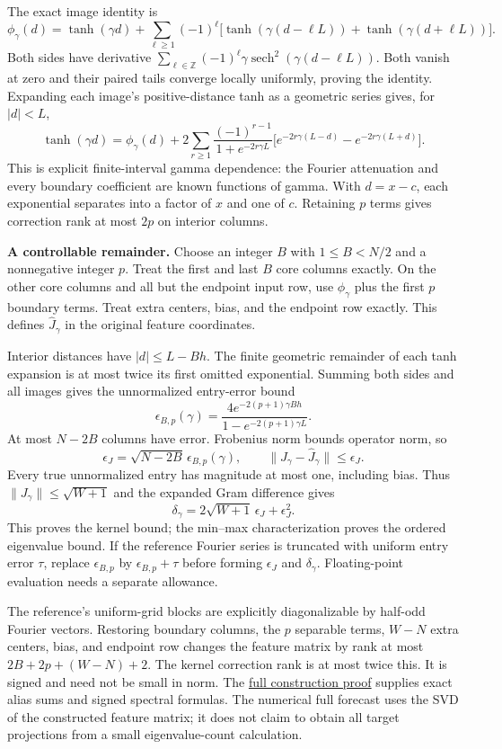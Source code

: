 \documentclass[11pt]{article}
\DeclareMathOperator{\sech}{sech}
\theoremstyle{definition}
\newcommand{\repo}{https://github.com/samlayton99/precision-mlps/blob/experiment/frozen-gamma-probe}
\begin{document}
The exact image identity is
\[
\phi_\gamma(d)=\tanh(\gamma d)+\sum_{\ell\ge1}(-1)^\ell
\big[\tanh(\gamma(d-\ell L))+\tanh(\gamma(d+\ell L))\big].
\]
Both sides have derivative
$\sum_{\ell\in\mathbb Z}(-1)^\ell\gamma\sech^2(\gamma(d-\ell L))$.
Both vanish at zero and their paired tails converge locally uniformly,
proving the identity. Expanding each image's positive-distance tanh as
a geometric series gives, for $|d|<L$,
\[
\tanh(\gamma d)=\phi_\gamma(d)+
2\sum_{r\ge1}\frac{(-1)^{r-1}}{1+e^{-2r\gamma L}}
\big[e^{-2r\gamma(L-d)}-e^{-2r\gamma(L+d)}\big].
\]
This is explicit finite-interval gamma dependence: the Fourier attenuation
and every boundary coefficient are known functions of gamma. With $d=x-c$,
each exponential separates into a factor of $x$ and one of $c$.
Retaining $p$ terms gives correction rank at most $2p$ on interior columns.

\textbf{A controllable remainder.}
Choose an integer $B$ with $1\le B<N/2$ and a nonnegative integer $p$.
Treat the first and last $B$ core columns exactly.
On the other core columns and all but the endpoint input row, use
$\phi_\gamma$ plus the first $p$ boundary terms. Treat extra centers, bias,
and the endpoint row exactly. This defines $\widehat J_\gamma$ in the
original feature coordinates.

Interior distances have $|d|\le L-Bh$. The finite geometric remainder of
each tanh expansion is at most twice its first omitted exponential.
Summing both sides and all images gives the unnormalized entry-error bound
\[
\epsilon_{B,p}(\gamma)=
\frac{4e^{-2(p+1)\gamma Bh}}{1-e^{-2(p+1)\gamma L}}.
\]
At most $N-2B$ columns have error. Frobenius norm bounds operator norm, so
\[
\epsilon_J=\sqrt{N-2B}\,\epsilon_{B,p}(\gamma),\qquad
\|J_\gamma-\widehat J_\gamma\|\le\epsilon_J.
\]
Every true unnormalized entry has magnitude at most one, including bias.
Thus $\|J_\gamma\|\le\sqrt{W+1}$ and the expanded Gram difference gives
\[
\boxed{\delta_\gamma=2\sqrt{W+1}\,\epsilon_J+\epsilon_J^2.}
\]
This proves the kernel bound; the min--max characterization proves the
ordered eigenvalue bound. If the reference Fourier series is truncated
with uniform entry error $\tau$, replace $\epsilon_{B,p}$ by
$\epsilon_{B,p}+\tau$ before forming $\epsilon_J$ and $\delta_\gamma$.
Floating-point evaluation needs a separate allowance.

The reference's uniform-grid blocks are explicitly diagonalizable by
half-odd Fourier vectors. Restoring boundary columns, the $p$ separable
terms, $W-N$ extra centers, bias, and endpoint row changes the feature
matrix by rank at most $2B+2p+(W-N)+2$. The kernel correction rank is
at most twice this. It is signed and need not be small in norm. The
\href{\repo/docs/gamma_uniform_grid_theorem.md}{full construction proof}
supplies exact alias sums and signed spectral formulas. The numerical full
forecast uses the SVD of the constructed feature matrix; it does not claim
to obtain all target projections from a small eigenvalue-count calculation.
\end{document}
